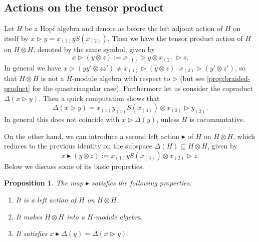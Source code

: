 \documentclass[a4paper, 12pt, reqno, english]{amsart}
\numberwithin{equation}{section}
\numberwithin{figure}{section}
\theoremstyle{plain}
\theoremstyle{plain}
\theoremstyle{plain}
\newtheorem{proposition}[theorem]{Proposition}
\theoremstyle{plain}
\theoremstyle{plain}
\theoremstyle{definition}
\theoremstyle{definition}
\theoremstyle{definition}
\theoremstyle{remark}
\theoremstyle{definition}
\theoremstyle{definition}
\begin{document}
\subsection{Actions on the tensor product}

Let $H$ be a Hopf algebra and denote as before the left adjoint action of $H$ on itself by $x \triangleright y = x_{(1)} y S(x_{(2)})$.
Then we have the tensor product action of $H$ on $H \otimes H$, denoted by the same symbol, given by
\[
x \triangleright (y \otimes z) := x_{(1)} \triangleright y \otimes x_{(2)} \triangleright z.
\]
In general we have $x \triangleright (y y' \otimes z z') \neq x_{(1)} \triangleright (y \otimes z) \cdot x_{(2)} \triangleright (y' \otimes z')$, so that $H \otimes H$ is not a $H$-module algebra with respect to $\triangleright$ (but see \cref{prop:braided-product} for the quasitriangular case).
Furthermore let us consider the coproduct $\Delta(x \triangleright y)$. Then a quick computation shows that
\[
\Delta(x \triangleright y) = x_{(1)} y_{(1)} S(x_{(3)}) \otimes x_{(2)} \triangleright y_{(2)}.
\]
In general this does not coincide with $x \triangleright \Delta(y)$, unless $H$ is cocommutative.

On the other hand, we can introduce a second left action $\blacktriangleright$ of $H$ on $H \otimes H$, which reduces to the previous identity on the subspace $\Delta(H) \subseteq H \otimes H$, given by
\[
x \blacktriangleright (y \otimes z) := x_{(1)} y S(x_{(3)}) \otimes x_{(2)} \triangleright z.
\]
Below we discuss some of its basic properties.

\begin{proposition}
The map $\blacktriangleright$ satisfies the following properties:
\begin{enumerate}
\item It is a left action of $H$ on $H \otimes H$.
\item It makes $H \otimes H$ into a $H$-module algebra.
\item It satisfies $x \blacktriangleright \Delta(y) = \Delta(x \triangleright y)$.
\end{enumerate}
\end{proposition}
\end{document}
